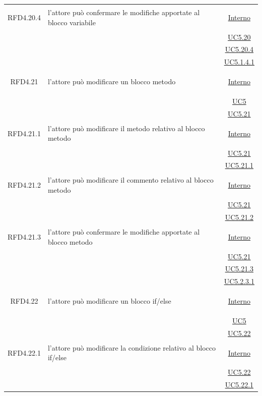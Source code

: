 \begin{longtable}{|c|>{\centering}m{7cm}|c|}
\hypertarget{RFD4.20.4}{RFD4.20.4} & l'attore può confermare le modifiche apportate al blocco variabile &  \hyperlink{Interno}{Interno}\\
& &\hyperref[UC5.20]{UC5.20}\\
& &\hyperref[UC5.20.4]{UC5.20.4}\\ 
& &\hyperref[UC5.1.4.1]{UC5.1.4.1}\\ \hline

\hypertarget{RFD4.21}{RFD4.21} & l'attore può modificare un blocco metodo &  \hyperlink{Interno}{Interno}\\
& &\hyperref[UC5]{UC5}\\
& &\hyperref[UC5.21]{UC5.21}\\ \hline

\hypertarget{RFD4.21.1}{RFD4.21.1} & l'attore può modificare il metodo relativo al blocco metodo &  \hyperlink{Interno}{Interno}\\
& &\hyperref[UC5.21]{UC5.21}\\
& &\hyperref[UC5.21.1]{UC5.21.1}\\ \hline

\hypertarget{RFD4.21.2}{RFD4.21.2} & l'attore può modificare il commento relativo al blocco metodo &  \hyperlink{Interno}{Interno}\\
& &\hyperref[UC5.21]{UC5.21}\\
& &\hyperref[UC5.21.2]{UC5.21.2}\\ \hline

\hypertarget{RFD4.21.3}{RFD4.21.3} & l'attore può confermare le modifiche apportate al blocco metodo &  \hyperlink{Interno}{Interno}\\
& &\hyperref[UC5.21]{UC5.21}\\
& &\hyperref[UC5.21.3]{UC5.21.3}\\
& &\hyperref[UC5.2.3.1]{UC5.2.3.1}\\ \hline

\hypertarget{RFD4.22}{RFD4.22} & l'attore può modificare un blocco if/else &  \hyperlink{Interno}{Interno}\\
& &\hyperref[UC5]{UC5}\\
& &\hyperref[UC5.22]{UC5.22}\\ \hline

\hypertarget{RFD4.22.1}{RFD4.22.1} & l'attore può modificare la condizione relativo al blocco if/else &  \hyperlink{Interno}{Interno}\\
& &\hyperref[UC5.22]{UC5.22}\\
& &\hyperref[UC5.22.1]{UC5.22.1}\\ \hline


\end{longtable}
